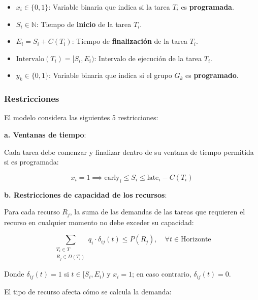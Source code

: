 \documentclass{article}
\begin{document}
\vspace{0.5cm}

\begin{tcolorbox}[colback=gray!5!white, colframe=gray!75!black, title={Variables de decisión}]
    \begin{itemize}
        \item \( x_i \in \{0, 1\} \): Variable binaria que indica si la tarea \( T_i \) es \textbf{programada}.
        \item \( S_i \in \mathbb{N} \): Tiempo de \textbf{inicio} de la tarea \( T_i \).
        \item \( E_i = S_i + C(T_i) \): Tiempo de \textbf{finalización} de la tarea \( T_i \).
        \item \( \text{Intervalo}(T_i) = [S_i, E_i) \): Intervalo de ejecución de la tarea \( T_i \).
        \item \( y_k \in \{0, 1\} \): Variable binaria que indica si el grupo \( G_k \) es \textbf{programado}.
    \end{itemize}
\end{tcolorbox}

\vspace{0.5cm}

\subsubsection{Restricciones}

El modelo considera las siguientes 5 restricciones:

\textbf{a. Ventanas de tiempo}:

Cada tarea debe comenzar y finalizar dentro de su ventana de tiempo permitida si es programada:

\[
x_i = 1 \implies \text{early}_i \leq S_i \leq \text{late}_i - C(T_i)
\]

\textbf{b. Restricciones de capacidad de los recursos}:

Para cada recurso \( R_j \), la suma de las demandas de las tareas que requieren el recurso en cualquier momento no debe exceder su capacidad:

\[
\sum_{\substack{T_i \in T \\ R_j \in D(T_i)}} q_i \cdot \delta_{ij}(t) \leq P(R_j), \quad \forall t \in \text{Horizonte}
\]

Donde \( \delta_{ij}(t) = 1 \) si \( t \in [S_i, E_i) \) y \( x_i = 1 \); en caso contrario, \( \delta_{ij}(t) = 0 \).

El tipo de recurso afecta cómo se calcula la demanda:
\end{document}
